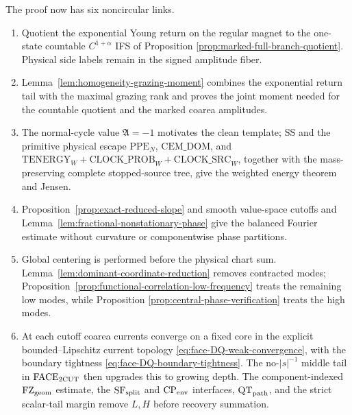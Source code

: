 \documentclass[11pt]{article}
\begin{document}
The proof now has six noncircular links.
\begin{enumerate}[label=\textup{(F\arabic*)}]
\item Quotient the exponential Young return on the regular magnet to the
      one-state countable $C^{1+\alpha}$ IFS of Proposition
      \ref{prop:marked-full-branch-quotient}.  Physical side labels remain
      in the signed amplitude fiber.
\item Lemma~\ref{lem:homogeneity-grazing-moment} combines the exponential
      return tail with the maximal grazing rank and proves the joint moment
      needed for the countable quotient and the marked coarea amplitudes.
\item The normal-cycle value $\mathfrak A=-1$ motivates the clean template;
      $\mathrm{SS}$ and the primitive physical escape
      $\mathrm{PPE}_{N}$, $\mathrm{CEM\_DOM}$, and
      $\mathrm{TENERGY}_{W}+\mathrm{CLOCK\_PROB}_{W}
      +\mathrm{CLOCK\_SRC}_{W}$, together with the
      mass-preserving complete stopped-source tree, give the weighted energy
      theorem and Jensen.
\item Proposition~\ref{prop:exact-reduced-slope} and smooth value-space
      cutoffs and Lemma~\ref{lem:fractional-nonstationary-phase} give the
      balanced Fourier estimate without curvature or componentwise phase
      partitions.
\item Global centering is performed before the physical chart sum.
      Lemma~\ref{lem:dominant-coordinate-reduction} removes contracted modes;
      Proposition~\ref{prop:functional-correlation-low-frequency} treats the
      remaining low modes, while Proposition
      \ref{prop:central-phase-verification} treats the high modes.
\item At each cutoff coarea currents converge on a fixed core in the explicit
      bounded--Lipschitz current topology
      \eqref{eq:face-DQ-weak-convergence}, with the boundary tightness
      \eqref{eq:face-DQ-boundary-tightness}.  The no-$|s|^{-1}$ middle tail
      in $\mathrm{FACE}_{\rm 2CUT}$ then upgrades this to growing depth.  The
      component-indexed $\mathrm{FZ}_{\rm geom}$ estimate, the
      $\mathrm{SF}_{\rm split}$ and $\mathrm{CP}_{\rm env}$ interfaces,
      $\mathrm{QT}_{\rm path}$, and the strict scalar-tail margin remove
      $L,H$ before recovery summation.
\end{enumerate}
\end{document}
